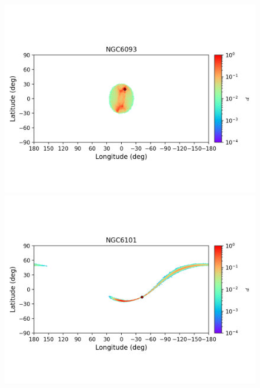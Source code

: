 \begin{figure}
\begin{center}
                \includegraphics[clip=true, trim = 0mm 20mm 0mm 10mm, width=1\columnwidth]{images/error_plots_NGC6093.png}
                \includegraphics[clip=true, trim = 0mm 20mm 0mm 10mm, width=1\columnwidth]{images/error_plots_NGC6101.png}
                

\end{center}
\end{figure}
